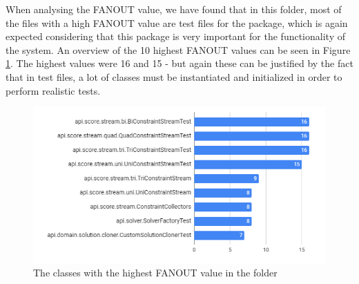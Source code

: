 \begin{itemize}
\begin{figure}[H]
        \end{figure}
        When analysing the FANOUT value, we have found that in this folder, most of the files with a high FANOUT value are test files for the  package, which is again expected considering that this package is very important for the functionality of the system. An overview of the 10 highest FANOUT values can be seen in Figure \ref{fig:fanoutapi}. The highest values were 16 and 15 - but again these can be justified by the fact that in test files, a lot of classes must be instantiated and initialized in order to perform realistic tests. 
        \begin{figure}[H]
            \centering
            \includegraphics[scale=0.8]{figures/step4/step4.2/FANOUT_api.PNG}
            \caption{The classes with the highest FANOUT value in the  folder}
            \label{fig:fanoutapi}
        \end{figure}
        

\end{itemize}
